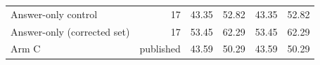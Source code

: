 \begin{table}[t]
{\begin{tabular}{lrrrrr}
Answer-only control & 17 & 43.35 & 52.82 & 43.35 & 52.82 \\
Answer-only (corrected set) & 17 & 53.45 & 62.29 & 53.45 & 62.29 \\
Arm C & published & 43.59 & 50.29 & 43.59 & 50.29 \\

\end{tabular}}
\end{table}
